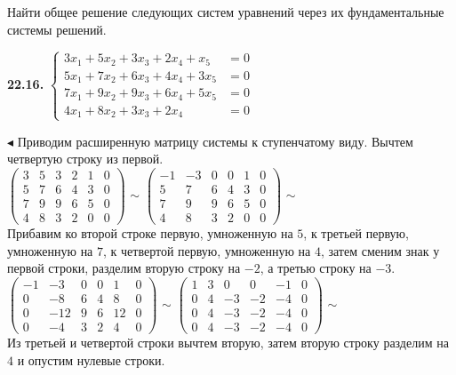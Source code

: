 \documentclass[a5paper,10pt]{article}
\begin{document}
\bigskip
\noindent
Найти общее решение следующих систем уравнений через их фундаментальные системы решений.

\medskip
\noindent
{\bf 22.16.}
$\begin{cases}
3x_1+5x_2+3x_3+2x_4+x_5&=0\\
5x_1+7x_2+6x_3+4x_4+3x_5&=0\\
7x_1+9x_2+9x_3+6x_4+5x_5&=0\\
4x_1+8x_2+3x_3+2x_4&=0
\end{cases}$

\medskip
\noindent
$\blacktriangleleft$ Приводим расширенную матрицу системы к ступенчатому виду. Вычтем четвертую строку из первой.\\[3pt]
$\left(\begin{array}{rrrrr|r}
3& 5& 3& 2& 1& 0\\
5& 7& 6& 4& 3& 0\\
7& 9& 9& 6& 5& 0\\
4& 8& 3& 2& 0& 0
\end{array}\right)$
$\sim$
$\left(\begin{array}{rrrrr|r}
-1& -3& 0& 0& 1& 0\\
5& 7& 6& 4& 3& 0\\
7& 9& 9& 6& 5& 0\\
4& 8& 3& 2& 0& 0
\end{array}\right)$
$\sim$\\[3pt]
 Прибавим ко второй строке первую, умноженную на $5$, к третьей первую, умноженную на $7$, к четвертой первую, умноженную на $4$, затем сменим знак у первой строки, разделим вторую строку на $-2$, а третью строку на $-3$.\\[3pt]
$\left(\begin{array}{rrrrr|r}
-1& -3& 0& 0& 1& 0\\
0& -8& 6& 4& 8& 0\\
0& -12& 9& 6& 12& 0\\
0& -4& 3& 2& 4& 0
\end{array}\right)$
$\sim$
$\left(\begin{array}{rrrrr|r}
1& 3& 0& 0& -1& 0\\
0& 4& -3& -2& -4& 0\\
0& 4& -3& -2& -4& 0\\
0& 4& -3& -2& -4& 0
\end{array}\right)$
$\sim$\\[3pt]
Из третьей и четвертой строки вычтем вторую, затем вторую строку разделим на $4$ и опустим нулевые строки.\\[3pt]
\end{document}
